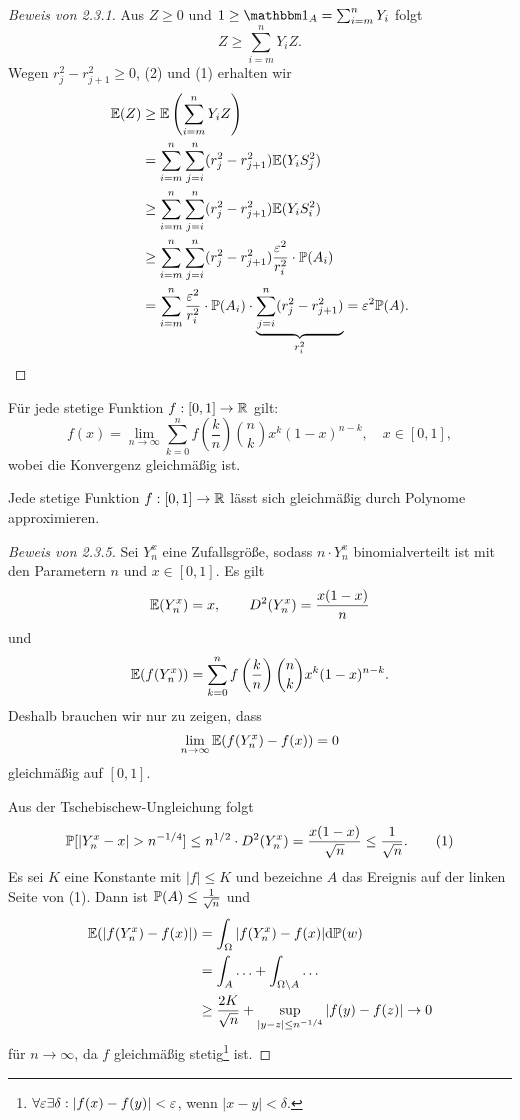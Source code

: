 \begin{proof}[Beweis von 2.3.1]
  Aus $Z \ge 0$ und $1 \ge \ind_A = \sum_{i=m}^n Y_i$ folgt
  \[ Z \ge \sum_{i=m}^n Y_i Z. \]
  Wegen $r_j^2 - r_{j+1}^2 \ge 0$, (2) und (1) erhalten wir
  \begin{align*}
    \mathbb{E}(Z) &\ge \mathbb{E} \left( \sum_{i=m}^n Y_i Z \right) \\
           &= \sum_{i=m}^n \sum_{j=i}^n (r_j^2 - r_{j+1}^2) \mathbb{E}( Y_i S_j^2 ) \\
           &\ge \sum_{i=m}^n \sum_{j=i}^n (r_j^2 - r_{j+1}^2) \mathbb{E}( Y_i S_i^2 ) \\
           &\ge \sum_{i=m}^n \sum_{j=i}^n (r_j^2 - r_{j+1}^2) \frac{\varepsilon^2}{r_i^2} \cdot \mathbb{P}(A_i) \\
           &= \sum_{i=m}^n \frac{\varepsilon^2}{r_i^2} \cdot \mathbb{P}(A_i) \cdot
             \underbrace{\sum_{j=i}^n (r_j^2 - r_{j+1}^2)}_{r_i^2}
             = \varepsilon^2 \mathbb{P}(A). \qedhere
  \end{align*}
\end{proof}

\clearpage

\begin{thm}
  Für jede stetige Funktion $f : [0,1] \to \mathbb{R}$ gilt:
  \[ f(x) = \lim_{n \to \infty} \sum_{k=0}^n f \left( \frac{k}{n} \right)
    \binom{n}{k} x^k (1-x)^{n-k}, \quad x \in [0,1], \]
  wobei die Konvergenz gleichmäßig ist.
\end{thm}

\begin{folg}[Weierstrass]
  Jede stetige Funktion $f : [0,1] \to \mathbb{R}$ lässt sich gleichmäßig durch
  Polynome approximieren.
\end{folg}

\begin{proof}[Beweis von 2.3.5]
  Sei $Y_n^x$ eine Zufallsgröße, sodass $n \cdot Y_n^x$ binomialverteilt ist mit
  den Parametern $n$ und $x \in [0,1]$. Es gilt
  \[ \mathbb{E}(Y_n^x) = x, \qquad D^2(Y_n^x) = \frac{x(1-x)}{n} \]
  und
  \[ \mathbb{E}(f(Y_n^x)) = \sum_{k=0}^n f \left( \frac{k}{n} \right) \binom{n}{k} x^k
    (1-x)^{n-k}. \]
  Deshalb brauchen wir nur zu zeigen, dass
  \[ \lim_{n \to \infty} \mathbb{E}( f(Y_n^x) - f(x) ) = 0 \]
  gleichmäßig auf $[0,1]$.

  Aus der Tschebischew-Ungleichung folgt
  \[ \mathbb{P} [ |Y_n^x - x| > n^{-1/4} ] \le n^{1/2} \cdot D^2(Y_n^x) =
    \frac{x(1-x)}{\sqrt{n}} \le \frac{1}{\sqrt{n}}. \tag{1} \]
  Es sei $K$ eine Konstante mit $|f| \le K$ und bezeichne $A$ das Ereignis auf
  der linken Seite von (1). Dann ist $\mathbb{P}(A) \le \frac{1}{\sqrt{n}}$ und
  \begin{align*}
    \mathbb{E}( |f(Y_n^x) - f(x)|) 
    &= \int_\Omega | f(Y_n^x) - f(x) | \mathrm{d} \mathbb{P}(w) \\
    &= \int_A \ldots + \int_{\Omega \setminus A} \ldots \\
    &\ge \frac{2K}{\sqrt{n}} + \sup_{|y-z| \le n^{-1/4}} |f(y) - f(z)|
      \to 0
  \end{align*}
  für $n \to \infty$, da $f$ gleichmäßig stetig\footnote{%
    $\forall \varepsilon \exists \delta : | f(x) - f(y) | < \varepsilon$, wenn $|x-y| < \delta$.
  } ist.
\end{proof}

